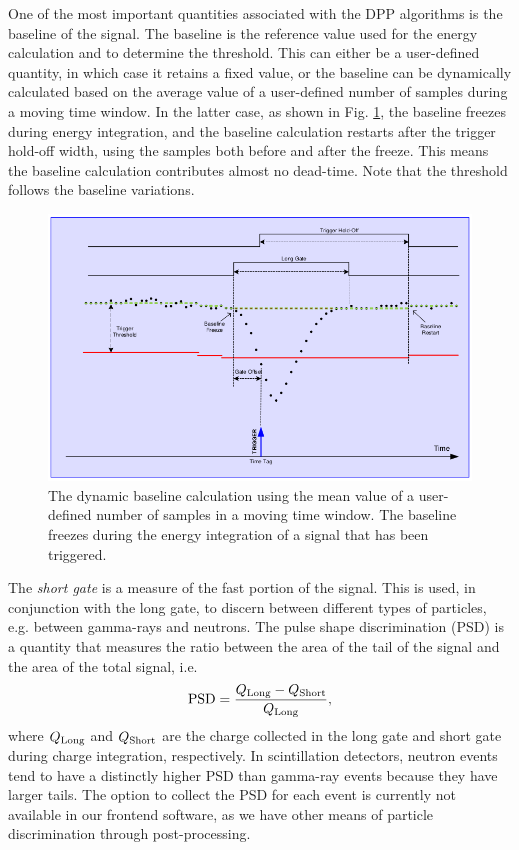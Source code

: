 One of the most important quantities associated with the DPP algorithms is the baseline of the signal. The baseline is the reference value used for the energy calculation and to determine the threshold. This can either be a user-defined quantity, in which case it retains a fixed value, or the baseline can be dynamically calculated based on the average value of a user-defined number of samples during a moving time window. In the latter case, as shown in Fig. \ref{fig:baseline_calc}, the baseline freezes during energy integration, and the baseline calculation restarts after the trigger hold-off width, using the samples both before and after the freeze. This means the baseline calculation contributes almost no dead-time. Note that the threshold follows the baseline variations.

\begin{figure}[t]
\centering
\includegraphics[width=6.5in]{Chapter-5/figs/baseline.png}
\caption{\label{fig:baseline_calc}The dynamic baseline calculation using the mean value of a user-defined number of samples in a moving time window. The baseline freezes during the energy integration of a signal that has been triggered.}
\end{figure}

The \emph{short gate} is a measure of the fast portion of the signal. This is used, in conjunction with the long gate, to discern between different types of particles, e.g. between gamma-rays and neutrons. The pulse shape discrimination (PSD) is a quantity that measures the ratio between the area of the tail of the signal and the area of the total signal, i.e.
\begin{equation*}
\textnormal{PSD} = \frac{Q_{\textnormal{Long}} - Q_{\textnormal{Short}}}{Q_{\textnormal{Long}}},
\end{equation*}
where $Q_{\textnormal{Long}}$ and $Q_{\textnormal{Short}}$ are the charge collected in the long gate and short gate during charge integration, respectively. In scintillation detectors, neutron events tend to have a distinctly higher PSD than gamma-ray events because they have larger tails. The option to collect the PSD for each event is currently not available in our frontend software, as we have other means of particle discrimination through post-processing.

